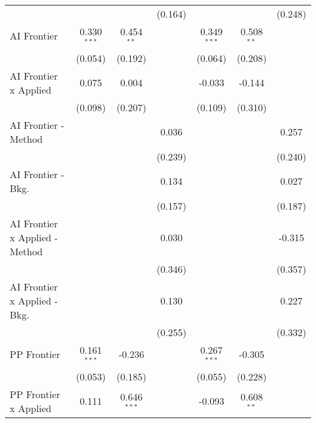 \begin{tabular}{lcccccc}
                                  &               &               & (0.164)        &                &               & (0.248)\\   
   AI Frontier                    & 0.330$^{***}$ & 0.454$^{**}$  &                & 0.349$^{***}$  & 0.508$^{**}$  &   \\   
                                  & (0.054)       & (0.192)       &                & (0.064)        & (0.208)       &   \\   
   AI Frontier x Applied          & 0.075         & 0.004         &                & -0.033         & -0.144        &   \\   
                                  & (0.098)       & (0.207)       &                & (0.109)        & (0.310)       &   \\   
   AI Frontier - Method           &               &               & 0.036          &                &               & 0.257\\   
                                  &               &               & (0.239)        &                &               & (0.240)\\   
   AI Frontier - Bkg.             &               &               & 0.134          &                &               & 0.027\\   
                                  &               &               & (0.157)        &                &               & (0.187)\\   
   AI Frontier x Applied - Method &               &               & 0.030          &                &               & -0.315\\   
                                  &               &               & (0.346)        &                &               & (0.357)\\   
   AI Frontier x Applied - Bkg.   &               &               & 0.130          &                &               & 0.227\\   
                                  &               &               & (0.255)        &                &               & (0.332)\\   
   PP Frontier                    & 0.161$^{***}$ & -0.236        &                & 0.267$^{***}$  & -0.305        &   \\   
                                  & (0.053)       & (0.185)       &                & (0.055)        & (0.228)       &   \\   
   PP Frontier x Applied          & 0.111         & 0.646$^{***}$ &                & -0.093         & 0.608$^{**}$  &   \\   

\end{tabular}
